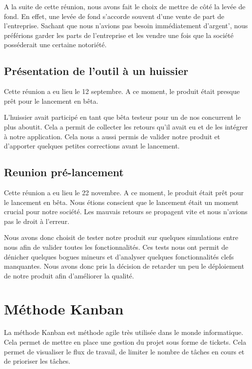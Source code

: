 \documentclass[]{report}
\begin{document}
      A la suite de cette réunion, nous avons fait le choix de mettre de côté la levée de fond. En effet, une levée de fond s'accorde souvent d'une vente de part de l'entreprise. Sachant que nous n'avions pas besoin immédiatement d'argent', nous préférions garder les parts de l'entreprise et les vendre une fois que la société posséderait une certaine notoriété.

    \subsection{Présentation de l’outil à un huissier}

      Cette réunion a eu lieu le 12 septembre. A ce moment, le produit était presque prêt pour le lancement en bêta.

      L'huissier avait participé en tant que bêta testeur pour un de nos concurrent le plus aboutit. Cela a permit de collecter les retours qu'il avait eu et de les intégrer à notre application. Cela nous a aussi permis de valider notre produit et d'apporter quelques petites corrections avant le lancement.

    \subsection{Reunion pré-lancement}\label{sec:pre_start_meeting}

      Cette réunion a eu lieu le 22 novembre. A ce moment, le produit était prêt pour le lancement en bêta. Nous étions conscient que le lancement était un moment crucial pour notre société. Les mauvais retours se propagent vite et nous n'avions pas le droit à l'erreur.

      Nous avons donc choisit de tester notre produit sur quelques simulations entre nous afin de valider toutes les fonctionnalités. Ces tests nous ont permit de dénicher quelques bogues mineurs et d'analyser quelques fonctionnalités clefs manquantes. Nous avons donc pris la décision de retarder un peu le déploiement de notre produit afin d'améliorer la qualité.

  \section{Méthode Kanban}

    La méthode Kanban est méthode agile très utilisée dans le monde informatique. Cela permet de mettre en place une gestion du projet sous forme de tickets. Cela permet de visualiser le flux de travail, de limiter le nombre de tâches en cours et de prioriser les tâches.
\end{document}
